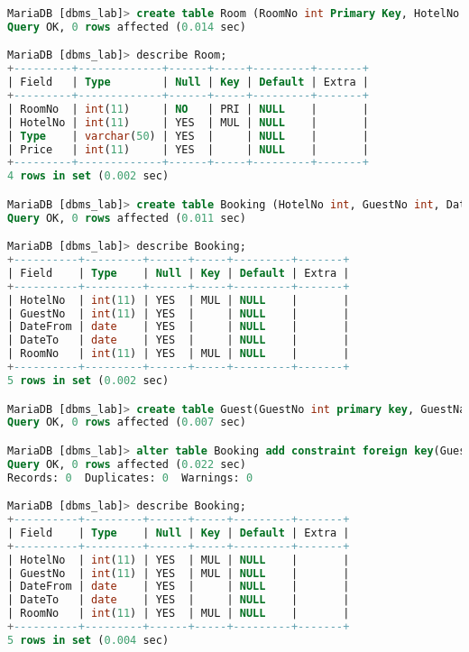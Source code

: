 \documentclass{article}
\begin{document}
\begin{lstlisting}[language=SQL]
MariaDB [dbms_lab]> create table Room (RoomNo int Primary Key, HotelNo int, Type varchar(50), Price int, foreign key(HotelNo) references Hotel(HotelNo));
Query OK, 0 rows affected (0.014 sec)

MariaDB [dbms_lab]> describe Room;
+---------+-------------+------+-----+---------+-------+
| Field   | Type        | Null | Key | Default | Extra |
+---------+-------------+------+-----+---------+-------+
| RoomNo  | int(11)     | NO   | PRI | NULL    |       |
| HotelNo | int(11)     | YES  | MUL | NULL    |       |
| Type    | varchar(50) | YES  |     | NULL    |       |
| Price   | int(11)     | YES  |     | NULL    |       |
+---------+-------------+------+-----+---------+-------+
4 rows in set (0.002 sec)

MariaDB [dbms_lab]> create table Booking (HotelNo int, GuestNo int, DateFrom date, DateTo date, RoomNo int, foreign key(HotelNo) references Hotel(HotelNo), foreign key(RoomNo) references Room(RoomNo));
Query OK, 0 rows affected (0.011 sec)

MariaDB [dbms_lab]> describe Booking;
+----------+---------+------+-----+---------+-------+
| Field    | Type    | Null | Key | Default | Extra |
+----------+---------+------+-----+---------+-------+
| HotelNo  | int(11) | YES  | MUL | NULL    |       |
| GuestNo  | int(11) | YES  |     | NULL    |       |
| DateFrom | date    | YES  |     | NULL    |       |
| DateTo   | date    | YES  |     | NULL    |       |
| RoomNo   | int(11) | YES  | MUL | NULL    |       |
+----------+---------+------+-----+---------+-------+
5 rows in set (0.002 sec)

MariaDB [dbms_lab]> create table Guest(GuestNo int primary key, GuestName varchar(50), GuessAddress varchar(50));
Query OK, 0 rows affected (0.007 sec)

MariaDB [dbms_lab]> alter table Booking add constraint foreign key(GuestNo) references Guest(GuestNo);
Query OK, 0 rows affected (0.022 sec)
Records: 0  Duplicates: 0  Warnings: 0

MariaDB [dbms_lab]> describe Booking;
+----------+---------+------+-----+---------+-------+
| Field    | Type    | Null | Key | Default | Extra |
+----------+---------+------+-----+---------+-------+
| HotelNo  | int(11) | YES  | MUL | NULL    |       |
| GuestNo  | int(11) | YES  | MUL | NULL    |       |
| DateFrom | date    | YES  |     | NULL    |       |
| DateTo   | date    | YES  |     | NULL    |       |
| RoomNo   | int(11) | YES  | MUL | NULL    |       |
+----------+---------+------+-----+---------+-------+
5 rows in set (0.004 sec)


\end{lstlisting}
\end{document}
